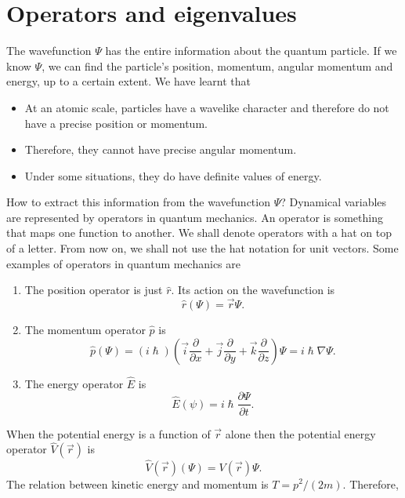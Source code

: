 \section{Operators and eigenvalues}\label{c4s3}
The wavefunction $\Psi$ has the entire information about the quantum particle.
If we know $\Psi$, we can find the particle's position, momentum, angular 
momentum and energy, up to a certain extent. We have learnt that 
\begin{itemize}
\item At an atomic scale, particles have a wavelike character and therefore
do not have a precise position or momentum.
\item Therefore, they cannot have precise angular momentum.
\item Under some situations, they do have definite values of energy.
\end{itemize}
How to extract this information from the wavefunction $\Psi$? Dynamical 
variables are represented by operators in quantum mechanics. An operator is
something that maps one function to another. We shall denote operators with
a hat on top of a letter. From now on, we shall not use the hat notation for
unit vectors. Some examples of operators in
quantum mechanics are
\begin{enumerate}
\item The position operator is just $\hat{r}$. Its action on the wavefunction is
\begin{equation}\label{c4s3e1}
\hat{r}(\Psi) = \vec{r}\Psi.
\end{equation}
\item The momentum operator $\hat{p}$ is
\begin{equation}\label{c4s3e2}
\hat{p}(\Psi) = (i\hslash)\left(\vec{i}\frac{\partial}{\partial x} + 
\vec{j}\frac{\partial}{\partial y} + \vec{k}\frac{\partial}{\partial z}
\right)\Psi
= i\hslash\nabla\Psi.
\end{equation}
\item The energy operator $\hat{E}$ is
\begin{equation}\label{c4s3e3}
\hat{E}(\psi) = i\hslash\frac{\partial\Psi}{\partial t}.
\end{equation}
\end{enumerate}
When the potential energy is a function of $\vec{r}$ alone then the potential
energy operator $\hat{V}(\vec{r})$ is
\begin{equation}\label{c4s3e4}
\hat{V}(\vec{r})(\Psi) = V(\vec{r})\Psi.
\end{equation}
The relation between kinetic energy and momentum is $T = p^2/(2m)$. Therefore,
